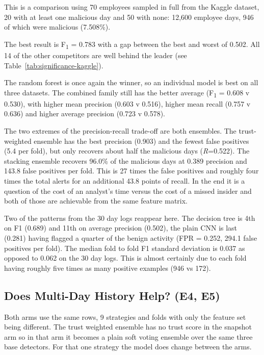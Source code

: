 \documentclass[a4paper,12pt]{article}
\newcommand{\resultinput}[1]{{\let\small\footnotesize\setlength{\tabcolsep}{4pt}}}
\begin{document}
This is a comparison using 70 employees sampled in full from the Kaggle dataset, 20 with at least one malicious day and 50 with none: 12,600 employee days, 946 of which were malicious (7.508\%).

\resultinput{tables/resultsKaggle}

The best result is F\textsubscript{1} = 0.783 with a gap between the best and worst of 0.502. All 14 of the other competitors are well behind the leader (see Table~\ref{tab:significance-kaggle}).

The random forest is once again the winner, so an individual model is best on all three datasets. The combined family still has the better average (F\textsubscript{1} = 0.608 v 0.530), with higher mean precision (0.603 v 0.516), higher mean recall (0.757 v 0.636) and higher average precision (0.723 v 0.578).

The two extremes of the precision-recall trade-off are both ensembles. The trust-weighted ensemble has the best precision (0.903) and the fewest false positives (5.4 per fold), but only recovers about half the malicious days (\emph{R}=0.522). The stacking ensemble recovers 96.0\% of the malicious days at 0.389 precision and 143.8 false positives per fold. This is 27 times the false positives and roughly four times the total alerts for an additional 43.8 points of recall. In the end it is a question of the cost of an analyst's time versus the cost of a missed insider and both of those are achievable from the same feature matrix.

Two of the patterns from the 30 day logs reappear here. The decision tree is 4th on F1 (0.689) and 11th on average precision (0.502), the plain CNN is last (0.281) having flagged a quarter of the benign activity (FPR = 0.252, 294.1 false positives per fold). The median fold to fold F1 standard deviation is 0.037 as opposed to 0.062 on the 30 day logs. This is almost certainly due to each fold having roughly five times as many positive examples (946 vs 172).

\resultinput{tables/significanceKaggle}

\subsection{Does Multi-Day History Help? (E4, E5)}
\label{sec:8.4}

Both arms use the same rows, 9 strategies and folds with only the feature set being different. The trust weighted ensemble has no trust score in the snapshot arm so in that arm it becomes a plain soft voting ensemble over the same three base detectors. For that one strategy the model does change between the arms.
\end{document}
